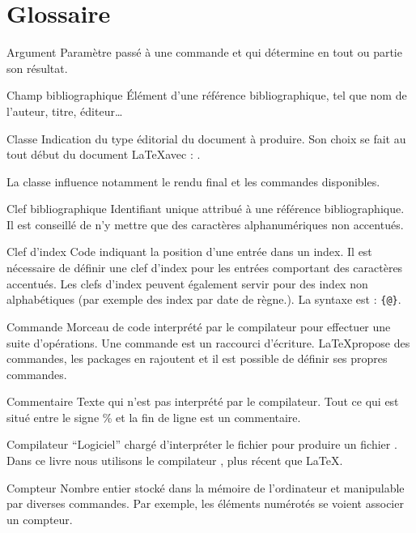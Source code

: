 \chapter{Glossaire}


\begin{glossaire}
\item[Argument] Paramètre passé à une commande et qui détermine en tout ou partie son résultat.


\item[Champ bibliographique] Élément d'une référence bibliographique, tel que nom de l'auteur, titre, éditeur…


\item[Classe] Indication du type éditorial du document à produire. Son choix se fait au tout début du document \LaTeX avec : . 

La classe influence notamment le rendu final et les commandes disponibles.

\item[Clef bibliographique] Identifiant unique attribué à une référence bibliographique. Il est conseillé de n'y mettre que des caractères alphanumériques non accentués.

\item[Clef d'index] Code indiquant la position d'une entrée dans un index. Il est nécessaire de définir une clef d'index pour les entrées comportant des caractères accentués. Les clefs d'index peuvent également servir pour des index non alphabétiques (par exemple des index par date de règne.). La syntaxe est : \verb|{|\verb|@|\verb|}|.

\item[Commande] Morceau de code  interprété par le compilateur pour effectuer une suite d'opérations. Une commande est un raccourci d'écriture. \LaTeX propose des commandes, les packages en rajoutent et il est possible de définir ses propres commandes.

\item[Commentaire] Texte qui n'est pas interprété par le compilateur. Tout ce qui est situé entre le signe \% et la fin de ligne est un commentaire.

\item[Compilateur] \enquote{Logiciel} chargé d'interpréter le fichier  pour produire un fichier . Dans ce livre nous utilisons le compilateur \XeLaTeX, plus récent que \LaTeX.

\item[Compteur] Nombre entier stocké dans la mémoire de l'ordinateur et manipulable par diverses commandes. Par exemple, les éléments numérotés se voient associer un compteur.



\end{glossaire}
